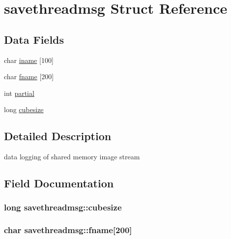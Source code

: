 \hypertarget{structsavethreadmsg}{}\section{savethreadmsg Struct Reference}
\label{structsavethreadmsg}
\subsection*{Data Fields}
\begin{DoxyCompactItemize}
\item 
char \hyperlink{structsavethreadmsg_acd2174c7310a13ba8b782fe91b6bc3ab}{iname} \mbox{[}100\mbox{]}
\item 
char \hyperlink{structsavethreadmsg_a86ce40d969ce095eb8ee5360b3298e8e}{fname} \mbox{[}200\mbox{]}
\item 
int \hyperlink{structsavethreadmsg_a67b95feb0e172459de37d4e23fab693b}{partial}
\item 
long \hyperlink{structsavethreadmsg_aabe32dc91c33ab3536ad6d2b6730159f}{cubesize}
\end{DoxyCompactItemize}


\subsection{Detailed Description}
data logging of shared memory image stream 

\subsection{Field Documentation}
\hypertarget{structsavethreadmsg_aabe32dc91c33ab3536ad6d2b6730159f}{}
\subsubsection[{cubesize}]{\setlength{\rightskip}{0pt plus 5cm}long savethreadmsg\+::cubesize}\label{structsavethreadmsg_aabe32dc91c33ab3536ad6d2b6730159f}
\hypertarget{structsavethreadmsg_a86ce40d969ce095eb8ee5360b3298e8e}{}
\subsubsection[{fname}]{\setlength{\rightskip}{0pt plus 5cm}char savethreadmsg\+::fname\mbox{[}200\mbox{]}}\label{structsavethreadmsg_a86ce40d969ce095eb8ee5360b3298e8e}
\hypertarget{structsavethreadmsg_acd2174c7310a13ba8b782fe91b6bc3ab}{}
